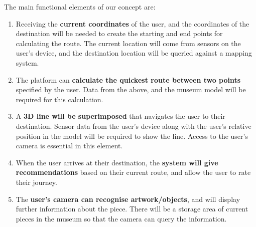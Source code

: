 
The main functional elements of our concept are:

\begin{enumerate}
	\item Receiving the \textbf{current coordinates} of the user, and the coordinates of the destination will be needed to create the starting and end points for calculating the route. The current location will come from sensors on the user's device, and the destination location will be queried against a mapping system.
	\item The platform can \textbf{calculate the quickest route between two points} specified by the user. Data from the above, and the museum model will be required for this calculation.
	\item A \textbf{3D line will be superimposed} that navigates the user to their destination. Sensor data from the user's device along with the user's relative position in the model will be required to show the line. Access to the user's camera is essential in this element.
	\item When the user arrives at their destination, the \textbf{system will give recommendations} based on their current route, and allow the user to rate their journey.
	\item The \textbf{user's camera can recognise artwork/objects}, and will display further information about the piece. There will be a storage area of current pieces in the museum so that the camera can query the information.
\end{enumerate}
